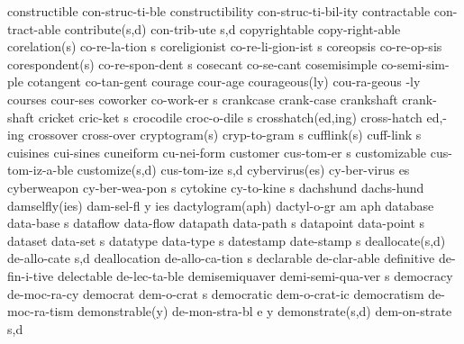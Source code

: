 \1 constructible	con-struc-ti-ble	%
\1 constructibility	con-struc-ti-bil-ity	%
\NewWordtrue
\1 contractable 	con-tract-able		%
\2 contribute(s,d)	con-trib-ute s,d
\1 copyrightable	copy-right-able		%
\2 corelation(s)	co-re-la-tion s		%
\5 coreligionist	co-re-li-gion-ist s	%
\1 coreopsis		co-re-op-sis		%
\2 corespondent(s)	co-re-spon-dent s	%
\1 cosecant		co-se-cant
\1 cosemisimple		co-semi-sim-ple		%
\1 cotangent		co-tan-gent
\NewWordtrue
\1 courage		cour-age		%
\NewWordtrue
\2 courageous(ly)	cou-ra-geous -ly
\1 courses		cour-ses
\5 coworker		co-work-er s		%
\1 crankcase		crank-case		%
\1 crankshaft		crank-shaft
\NewWordtrue
\5 cricket		cric-ket s		%
\5 crocodile		croc-o-dile s
\2 crosshatch(ed,ing)	cross-hatch ed,-ing
\1 crossover		cross-over		%
\2 cryptogram(s)	cryp-to-gram s		%
\2 cufflink(s)		cuff-link s		%
\NewWordtrue
\1 cuisines		cui-sines		%
\1 cuneiform		cu-nei-form		%
\NewWordtrue
\5 customer		cus-tom-er s		%
\1 customizable		cus-tom-iz-a-ble	%
\2 customize(s,d)	cus-tom-ize s,d		%
\2 cybervirus(es)	cy-ber-virus es		%
\5 cyberweapon		cy-ber-wea-pon s	%
\5 cytokine		cy-to-kine s		%
\1 dachshund		dachs-hund
\3 damselfly(ies)	dam-sel-fl y ies	%
\3 dactylogram(aph)	dactyl-o-gr am aph	%
\5 database		data-base s
\NewWordtrue
\1 dataflow		data-flow		%
\5 datapath		data-path s
\NewWordtrue
\5 datapoint		data-point s		%
\NewWordtrue
\5 dataset		data-set s		%
\NewWordtrue
\5 datatype		data-type s		%
\5 datestamp		date-stamp s            %
\2 deallocate(s,d)	de-allo-cate s,d	%
\5 deallocation		de-allo-ca-tion s	%
\1 declarable		de-clar-able
\1 definitive		de-fin-i-tive
\1 delectable		de-lec-ta-ble
\5 demisemiquaver	demi-semi-qua-ver s	%
\NewWordtrue
\1 democracy		de-moc-ra-cy		%
\NewWordtrue
\5 democrat		dem-o-crat s		%
\NewWordtrue
\1 democratic		dem-o-crat-ic		%
\1 democratism		de-moc-ra-tism
\NewWordtrue
\3 demonstrable(y)	de-mon-stra-bl e y	%
\NewWordtrue
\2 demonstrate(s,d)	dem-on-strate s,d	%
